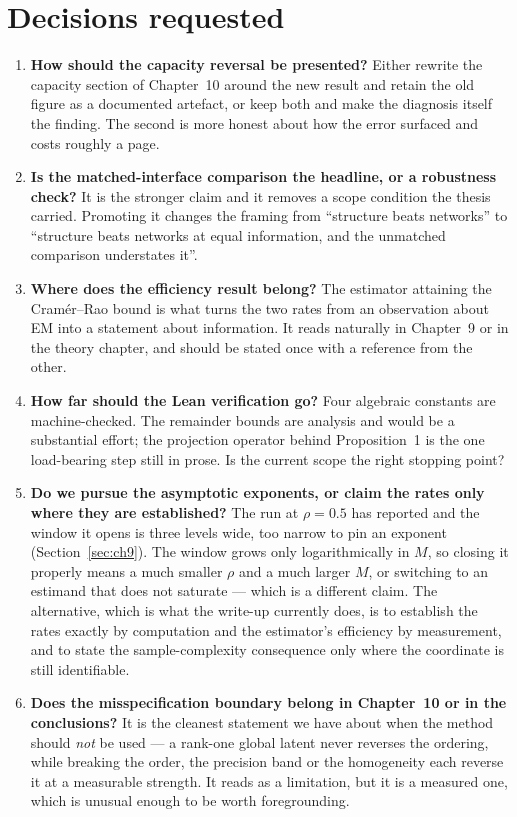 \documentclass[11pt,a4paper]{article}
\newcommand{\hi}[1]{\textbf{#1}}
\begin{document}
\section{Decisions requested}\label{sec:ask}

\begin{enumerate}
\item \hi{How should the capacity reversal be presented?} Either rewrite the capacity section of
Chapter~10 around the new result and retain the old figure as a documented artefact, or keep both
and make the diagnosis itself the finding. The second is more honest about how the error surfaced
and costs roughly a page.

\item \hi{Is the matched-interface comparison the headline, or a robustness check?} It is the
stronger claim and it removes a scope condition the thesis carried. Promoting it changes the
framing from ``structure beats networks'' to ``structure beats networks at equal information, and
the unmatched comparison understates it''.

\item \hi{Where does the efficiency result belong?} The estimator attaining the Cram\'er--Rao bound
is what turns the two rates from an observation about EM into a statement about information. It
reads naturally in Chapter~9 or in the theory chapter, and should be stated once with a reference
from the other.

\item \hi{How far should the Lean verification go?} Four algebraic constants are machine-checked.
The remainder bounds are analysis and would be a substantial effort; the projection operator behind
Proposition~1 is the one load-bearing step still in prose. Is the current scope the right stopping
point?

\item \hi{Do we pursue the asymptotic exponents, or claim the rates only where they are
established?} The run at $\rho=0.5$ has reported and the window it opens is three levels wide, too
narrow to pin an exponent (Section~\ref{sec:ch9}). The window grows only logarithmically in $M$, so
closing it properly means a much smaller $\rho$ and a much larger $M$, or switching to an estimand
that does not saturate --- which is a different claim. The alternative, which is what the write-up
currently does, is to establish the rates exactly by computation and the estimator's efficiency by
measurement, and to state the sample-complexity consequence only where the coordinate is still
identifiable.
\item \hi{Does the misspecification boundary belong in Chapter~10 or in the conclusions?} It is
the cleanest statement we have about when the method should \emph{not} be used --- a rank-one
global latent never reverses the ordering, while breaking the order, the precision band or the
homogeneity each reverse it at a measurable strength. It reads as a limitation, but it is a
measured one, which is unusual enough to be worth foregrounding.
\end{enumerate}
\end{document}
